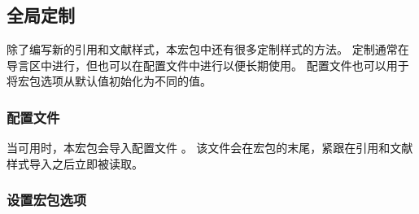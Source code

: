 \subsection{全局定制}%
\label{use:cfg}


除了编写新的引用和文献样式，本宏包中还有很多定制样式的方法。
定制通常在导言区中进行，但也可以在配置文件中进行以便长期使用。
配置文件也可以用于将宏包选项从默认值初始化为不同的值。

\subsubsection{配置文件}%
\label{use:cfg:cfg}


当可用时，本宏包会导入配置文件 。
该文件会在宏包的末尾，紧跟在引用和文献样式导入之后立即被读取。

\subsubsection{设置宏包选项}%
\label{use:cfg:opt}


